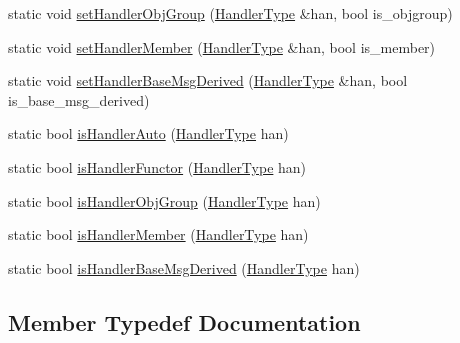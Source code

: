 \begin{DoxyCompactItemize}
\item 
static void \hyperlink{structvt_1_1_handler_manager_a0822ddaf90168e28fc9974e7f672b529}{set\+Handler\+Obj\+Group} (\hyperlink{namespacevt_af64846b57dfcaf104da3ef6967917573}{Handler\+Type} \&han, bool is\+\_\+objgroup)
\item 
static void \hyperlink{structvt_1_1_handler_manager_aca4acd8d7a769a2226931ae1febe6379}{set\+Handler\+Member} (\hyperlink{namespacevt_af64846b57dfcaf104da3ef6967917573}{Handler\+Type} \&han, bool is\+\_\+member)
\item 
static void \hyperlink{structvt_1_1_handler_manager_a8d5c057635b69508751d9b86bd1d3378}{set\+Handler\+Base\+Msg\+Derived} (\hyperlink{namespacevt_af64846b57dfcaf104da3ef6967917573}{Handler\+Type} \&han, bool is\+\_\+base\+\_\+msg\+\_\+derived)
\item 
static bool \hyperlink{structvt_1_1_handler_manager_a3324aeb71747bdd6b99194674dc03434}{is\+Handler\+Auto} (\hyperlink{namespacevt_af64846b57dfcaf104da3ef6967917573}{Handler\+Type} han)
\item 
static bool \hyperlink{structvt_1_1_handler_manager_a0d03f576b15390773522317a4086e725}{is\+Handler\+Functor} (\hyperlink{namespacevt_af64846b57dfcaf104da3ef6967917573}{Handler\+Type} han)
\item 
static bool \hyperlink{structvt_1_1_handler_manager_a41bb9a71156fa3010988e8b576022bf5}{is\+Handler\+Obj\+Group} (\hyperlink{namespacevt_af64846b57dfcaf104da3ef6967917573}{Handler\+Type} han)
\item 
static bool \hyperlink{structvt_1_1_handler_manager_a693afb1f820721217771ff0b9bcd71ae}{is\+Handler\+Member} (\hyperlink{namespacevt_af64846b57dfcaf104da3ef6967917573}{Handler\+Type} han)
\item 
static bool \hyperlink{structvt_1_1_handler_manager_a88c108df63f4d16a17485c08eefe31c5}{is\+Handler\+Base\+Msg\+Derived} (\hyperlink{namespacevt_af64846b57dfcaf104da3ef6967917573}{Handler\+Type} han)
\end{DoxyCompactItemize}


\subsection{Member Typedef Documentation}
\mbox{\label{structvt_1_1_handler_manager_ac2c93e168ab703b2441e0c38aa28a08f}} 
